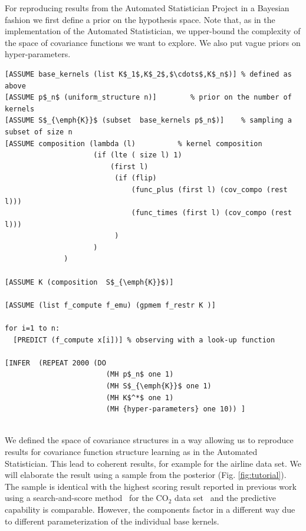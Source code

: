 \documentclass{article} %
\begin{document}
For reproducing results from the Automated Statistician Project in a Bayesian fashion we first define a prior on the hypothesis space. Note that, as in the implementation of the Automated Statistician, we upper-bound the complexity of the space of covariance functions we want to explore. We also put vague priors on hyper-parameters.


\begin{minipage}{\linewidth}
\small
\begin{lstlisting}[frame=single,label=alg:structureVent,caption=Venture Code for Bayesian GP Structure Learning,mathescape]
[ASSUME base_kernels (list K$_1$,K$_2$,$\cdots$,K$_n$)] % defined as above
[ASSUME p$_n$ (uniform_structure n)]        % prior on the number of kernels
[ASSUME S$_{\emph{K}}$ (subset  base_kernels p$_n$)]    % sampling a subset of size n
[ASSUME composition (lambda (l)          % kernel composition
                     (if (lte ( size l) 1)
                         (first l)
                          (if (flip)
                              (func_plus (first l) (cov_compo (rest l)))
                              (func_times (first l) (cov_compo (rest l)))
                          )
                     )
              )

[ASSUME K (composition  S$_{\emph{K}}$)]

[ASSUME (list f_compute f_emu) (gpmem f_restr K )]

for i=1 to n:
  [PREDICT (f_compute x[i])] % observing with a look-up function

[INFER  (REPEAT 2000 (DO 
                        (MH p$_n$ one 1) 
                        (MH S$_{\emph{K}}$ one 1) 
                        (MH K$^*$ one 1) 
                        (MH {hyper-parameters} one 10)) ]


\end{lstlisting}

\end{minipage}

We defined the space of covariance structures in a way allowing us to reproduce results for covariance function structure learning as in the Automated Statistician. This lead to coherent results, for example for the airline data set. We will elaborate the result using a sample from the posterior (Fig. \ref{fig:tutorial}). The sample is identical with the highest scoring result reported in previous work using a search-and-score method~\citep{duvenaud2013structure} for the CO$_2$ data set~\citep{} and the predictive capability is comparable. However, the components factor in a different way due to different parameterization of the individual base kernels.
\end{document}
